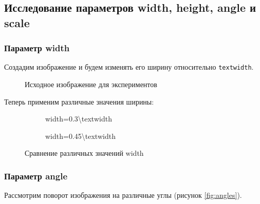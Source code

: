 \documentclass[12pt,a4paper]{article}
\begin{document}
\subsection{Исследование параметров width, height, angle и scale}

\subsubsection{Параметр width}

Создадим изображение и будем изменять его ширину относительно \texttt{textwidth}.

\begin{figure}[h]
\centering
{}
\caption{Исходное изображение для экспериментов}
\label{fig:original}
\end{figure}

Теперь применим различные значения ширины:

\begin{figure}[H]
\centering
\begin{subfigure}{0.3\textwidth}
    \centering
    \caption{width=0.3\textbackslash textwidth}
\end{subfigure}
\hfill
\begin{subfigure}{0.45\textwidth}
    \centering
    \caption{width=0.45\textbackslash textwidth}
\end{subfigure}
\caption{Сравнение различных значений width}
\label{fig:width_comparison}
\end{figure}

\subsubsection{Параметр angle}

Рассмотрим поворот изображения на различные углы (рисунок \ref{fig:angles}).
\end{document}
